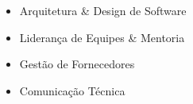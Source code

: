 %
%
%

\twocolumnsection
{
\begin{skills}
\end{skills}}
{
\vspace{1em}
\begin{itemize}
    \item Arquitetura \& Design de Software
	\item Liderança de Equipes \& Mentoria
	\item Gestão de Fornecedores
    \item Comunicação Técnica
\end{itemize}
}
